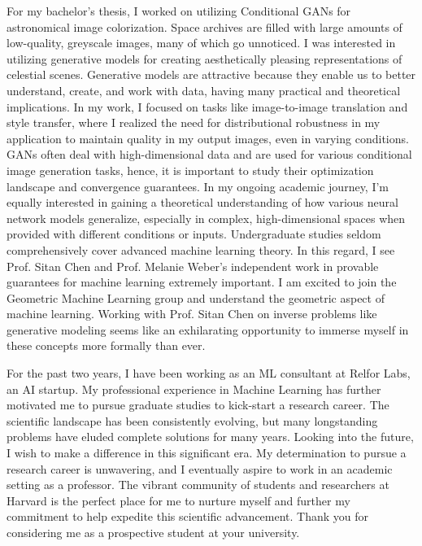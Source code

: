\documentclass{article}
\begin{document}
For my bachelor’s thesis, I worked on utilizing Conditional GANs for
astronomical image colorization. Space archives are filled with large amounts of
low-quality, greyscale images, many of which go unnoticed. I was interested in
utilizing generative models for creating aesthetically pleasing representations
of celestial scenes. Generative models are attractive because they enable us to
better understand, create, and work with data, having many practical and
theoretical implications. In my work, I focused on tasks like image-to-image
translation and style transfer, where I realized the need for distributional
robustness in my application to maintain quality in my output images, even in
varying conditions. GANs often deal with high-dimensional data and are used for
various conditional image generation tasks, hence, it is important to study
their optimization landscape and convergence guarantees. In my ongoing academic
journey, I’m equally interested in gaining a theoretical understanding of how
various neural network models generalize, especially in complex,
high-dimensional spaces when provided with different conditions or inputs.
Undergraduate studies seldom comprehensively cover advanced machine learning
theory. In this regard, I see Prof. Sitan Chen and Prof. Melanie Weber’s
independent work in provable guarantees for machine learning extremely
important. I am excited to join the Geometric Machine Learning group and
understand the geometric aspect of machine learning. Working with Prof. Sitan
Chen on inverse problems like generative modeling seems like an exhilarating
opportunity to immerse myself in these concepts more formally than ever.

For the past two years, I have been working as an ML consultant at Relfor Labs,
an AI startup. My professional experience in Machine Learning has further
motivated me to pursue graduate studies to kick-start a research career. The
scientific landscape has been consistently evolving, but many longstanding
problems have eluded complete solutions for many years. Looking into the future,
I wish to make a difference in this significant era. My determination to pursue
a research career is unwavering, and I eventually aspire to work in an academic
setting as a professor. The vibrant community of students and researchers at
Harvard is the perfect place for me to nurture myself and further my commitment
to help expedite this scientific advancement. Thank you for considering me as a
prospective student at your university.
\end{document}
